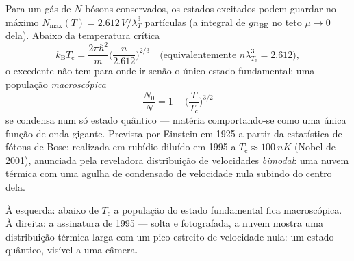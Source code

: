 \begin{theorem}\label{thm:b3:quantum-statistics:bec}
Para um gás de $N$ bósons conservados, os estados excitados podem
guardar no máximo $N_{\max}(T) = 2.612\,V/\lambda_T^3$ partículas (a
integral de $g\bar n_{\text{BE}}$ no teto $\mu \to 0$ dela). Abaixo da
temperatura crítica
\[
k_{\text{B}}T_{\text{c}} = \frac{2\pi\hbar^2}{m}
\Big(\frac{n}{2.612}\Big)^{2/3}
\quad\text{(equivalentemente } n\lambda_{T_{\text{c}}}^3 = 2.612
\text{)} ,
\]
o excedente não tem para onde ir senão o único estado fundamental: uma
população \emph{macroscópica}
\[
\frac{N_0}{N} = 1 - \Big(\frac{T}{T_{\text{c}}}\Big)^{3/2}
\]
se condensa num só estado quântico --- matéria comportando-se como uma
única função de onda gigante. Prevista por Einstein em 1925 a partir da
estatística de fótons de Bose; realizada em rubídio diluído em 1995 a
$T_{\text{c}} \approx \qty{100}{nK}$ (Nobel de 2001), anunciada pela
reveladora distribuição de velocidades \emph{bimodal}: uma nuvem térmica
com uma agulha de condensado de velocidade nula subindo do centro dela.
\end{theorem}
\admitted

\begin{omfigure}

{\small À esquerda: abaixo de $T_{\text{c}}$ a população do estado
fundamental fica macroscópica. À direita: a assinatura de 1995 ---
solta e fotografada, a nuvem mostra uma distribuição térmica larga com
um pico estreito de velocidade nula: um estado quântico, visível a uma câmera.}
\end{omfigure}

